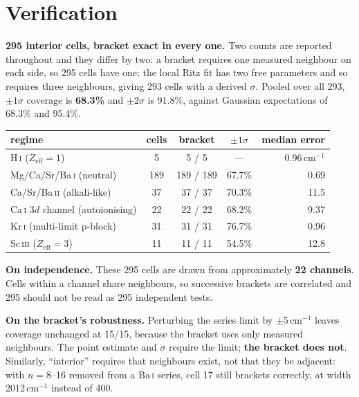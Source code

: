 \documentclass[11pt,a4paper]{article}
\theoremstyle{definition}
\newcommand{\Zeff}{\ensuremath{Z_{\mathrm{eff}}}}
\newcommand{\cmi}{\,\ensuremath{\mathrm{cm}^{-1}}}
\begin{document}
\section{Verification}
\textbf{295 interior cells, bracket exact in every one.} Two counts are reported
throughout and they differ by two: a bracket requires one measured neighbour on
each side, so 295 cells have one; the local Ritz fit has two free parameters and
so requires three neighbours, giving 293 cells with a derived $\sigma$. Pooled
over all 293, $\pm1\sigma$ coverage is \textbf{68.3\%} and $\pm2\sigma$ is
91.8\%, against Gaussian expectations of 68.3\% and 95.4\%.

\begin{center}\small
\begin{tabular}{@{}lcccr@{}}
\toprule
regime & cells & bracket & $\pm1\sigma$ & median error\\
\midrule
H\,\textsc{i} ($\Zeff=1$)                  & 5   & 5 / 5     & ---    & 0.96\cmi\\
Mg/Ca/Sr/Ba\,\textsc{i} (neutral)          & 189 & 189 / 189 & 67.7\% & 0.69\\
Ca/Sr/Ba\,\textsc{ii} (alkali-like)        & 37  & 37 / 37   & 70.3\% & 11.5\\
Ca\,\textsc{i} $3d$ channel (autoionising) & 22  & 22 / 22   & 68.2\% & 9.37\\
Kr\,\textsc{i} (multi-limit p-block)       & 31  & 31 / 31   & 76.7\% & 0.96\\
Sc\,\textsc{iii} ($\Zeff=3$)               & 11  & 11 / 11   & 54.5\% & 12.8\\
\bottomrule
\end{tabular}
\end{center}
\vspace{2mm}

\textbf{On independence.} These 295 cells are drawn from approximately
\textbf{22 channels}. Cells within a channel share neighbours, so successive
brackets are correlated and 295 should not be read as 295 independent tests.

\textbf{On the bracket's robustness.} Perturbing the series limit by
$\pm5$\cmi{} leaves coverage unchanged at 15/15, because the bracket uses only
measured neighbours. The point estimate and $\sigma$ require the limit;
\textbf{the bracket does not}. Similarly, ``interior'' requires that neighbours
exist, not that they be adjacent: with $n=8$--16 removed from a Ba\,\textsc{i}
series, cell 17 still brackets correctly, at width 2012\cmi{} instead of 400.
\end{document}
